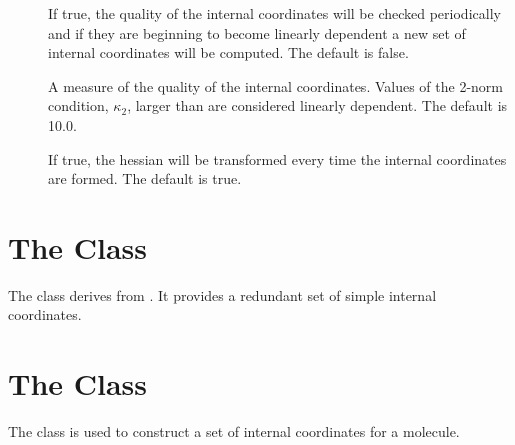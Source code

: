 \begin{description}
  \item[] If true, the quality of the internal
    coordinates will be checked periodically and if they are beginning to
    become linearly dependent a new set of internal coordinates will be
    computed.  The default is false.

  \item[] A measure of the quality of the internal
    coordinates.  Values of the 2-norm condition, $\kappa_2$, larger than
     are considered linearly dependent.  The default is
    10.0.

  \item[] If true, the hessian will be transformed
    every time the internal coordinates are formed.  The default is true.

\end{description}


\section{The  Class}\label{RedundMolecularCoor}

The  class derives from
.  It provides a redundant set of simple
internal coordinates.


\section{The  Class}\label{IntCoorGen}

The  class is used to construct a set of internal
coordinates for a molecule.

